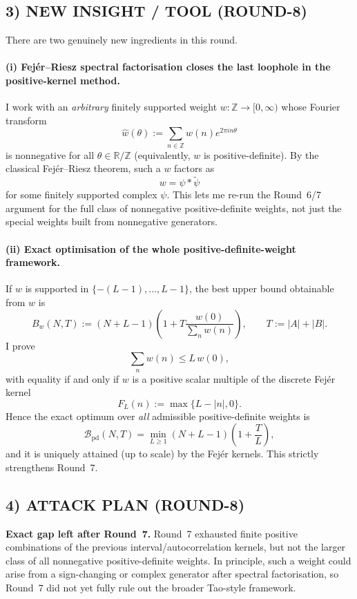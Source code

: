 \subsection{3) NEW INSIGHT / TOOL (ROUND-8)}

There are two genuinely new ingredients in this round.

\paragraph{(i) Fej\'er--Riesz spectral factorisation closes the last loophole in the positive-kernel method.}
I work with an \emph{arbitrary} finitely supported weight $w:\mathbb Z\to [0,\infty)$ whose Fourier transform
\[
\widehat w(\theta):=\sum_{n\in\mathbb Z} w(n)e^{2\pi i n\theta}
\]
is nonnegative for all $\theta\in\mathbb R/\mathbb Z$ (equivalently, $w$ is positive-definite).  By the classical Fej\'er--Riesz theorem, such a $w$ factors as
\[
w=\psi*\widetilde\psi
\]
for some finitely supported complex $\psi$.  This lets me re-run the Round~6/7 argument for the full class of nonnegative positive-definite weights, not just the special weights built from nonnegative generators.

\paragraph{(ii) Exact optimisation of the whole positive-definite-weight framework.}
If $w$ is supported in $\{-(L-1),\dots,L-1\}$, the best upper bound obtainable from $w$ is
\[
B_w(N,T):=(N+L-1)\left(1+T\frac{w(0)}{\sum_n w(n)}\right),
\qquad T:=|A|+|B|.
\]
I prove
\[
\sum_n w(n)\le L\,w(0),
\]
with equality if and only if $w$ is a positive scalar multiple of the discrete Fej\'er kernel
\[
F_L(n):=\max\{L-|n|,0\}.
\]
Hence the exact optimum over \emph{all} admissible positive-definite weights is
\[
\mathcal B_{\mathrm{pd}}(N,T)=\min_{L\ge 1}(N+L-1)\left(1+\frac{T}{L}\right),
\]
and it is uniquely attained (up to scale) by the Fej\'er kernels.  This strictly strengthens Round~7.

\subsection{4) ATTACK PLAN (ROUND-8)}

\textbf{Exact gap left after Round~7.}
Round~7 exhausted finite positive combinations of the previous interval/autocorrelation kernels, but not the larger class of all nonnegative positive-definite weights.  In principle, such a weight could arise from a sign-changing or complex generator after spectral factorisation, so Round~7 did not yet fully rule out the broader Tao-style framework.


